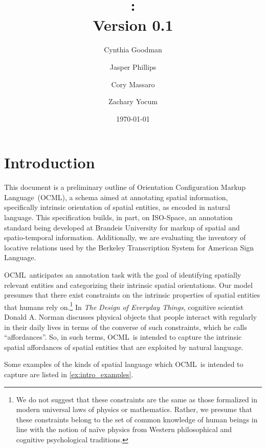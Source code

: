 \documentclass[11pt]{article}
\title{\nameML:\\
{\Large Version 0.1}}
\author{
    Cynthia Goodman\\
    \and
    Jasper Phillips\\
    \and
    Cory Massaro\\
    \and
    Zachary Yocum\\
}
\date{\today}
\newcommand{\nameML}{Orientation Configuration Markup Language}
\newcommand{\ML}{OCML}
\begin{document}
\maketitle

\tableofcontents 
\newpage

\section{Introduction} %
\label{sec:introduction}

This document is a preliminary outline of \nameML~(\ML), a schema aimed at annotating spatial information, specifically intrinsic orientation of spatial entities, as encoded in natural language. This specification builds, in part, on ISO-Space\cite{pustejovsky_moszkowicz:2011}, an annotation standard being developed at Brandeis University for markup of spatial and spatio-temporal information. Additionally, we are evaluating the inventory of locative relations used by the Berkeley Transcription System\cite{slobin:1999} for American Sign Language.

\ML~anticipates an annotation task with the goal of identifying spatially relevant entities and categorizing their intrinsic spatial orientations. Our model presumes that there exist constraints on the intrinsic properties of spatial entities that humans rely on.\footnote{We do not suggest that these constraints are the same as those formalized in modern universal laws of physics or mathematics. Rather, we presume that these constraints belong to the set of common knowledge of human beings in line with the notion of na\"ive physics from Western philosophical and cognitive psychological traditions.} In \emph{The Design of Everyday Things}\cite{norman:2002}, cognitive scientist Donald A. Norman discusses physical objects that people interact with regularly in their daily lives in terms of the converse of such constraints, which he calls ``affordances''. So, in such terms, \ML~is intended to capture the intrinsic spatial affordances of spatial entities that are exploited by natural language.

Some examples of the kinds of spatial language which \ML~is intended to capture are listed in \cref{ex:intro_examples}.

\label{ex:intro_examples}
\end{document}
